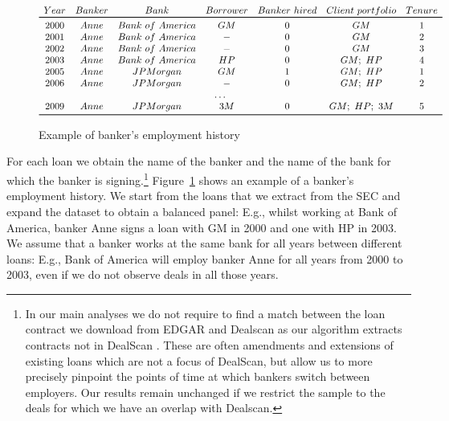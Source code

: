 \begin{figure}[H] \caption{Example of banker's employment history} \label{fig:ex} \begin{center}
	\( \begin{array}{ccccccc} 
	Year & Banker & Bank & Borrower & Banker~hired & Client~portfolio & Tenure \\ \toprule
	2000 & Anne & Bank~of~ America & GM & 0 & GM & 1\\
	2001 & Anne & Bank~of~ America & - & 0 & GM & 2\\
	2002 & Anne & Bank~of~ America & - & 0 & GM  & 3\\
	2003 & Anne & Bank~of~ America & HP & 0 & GM;~HP & 4  \\
	2005 & Anne & JPMorgan & GM & 1 & GM;~HP  & 1\\
	2006 & Anne & JPMorgan & - & 0 & GM;~HP  & 2\\
	\multicolumn{6}{c}{\ldots} \\
	2009 & Anne & JPMorgan & 3M & 0 & GM;~HP;~3M & 5\\ \bottomrule
	\end{array} \) 
\end{center} \end{figure}

For each loan we obtain the name of the banker and the name of the bank for which the banker is signing.\footnote{In our main analyses we do not require to find a match between the loan contract we download from EDGAR and Dealscan as our algorithm extracts contracts not in DealScan \citep{Herpfer.2018}. These are often amendments and extensions of existing loans which are not a focus of DealScan, but allow us to more precisely pinpoint the points of time at which  bankers switch between employers.  Our results remain unchanged if we restrict the sample to the deals for which we have an overlap with Dealscan.} Figure~\ref{fig:ex} shows an example of a banker's employment history. We start from the loans that we extract from the SEC and expand the dataset to obtain a balanced panel: E.g., whilst working at Bank of America, banker Anne signs a loan with GM in 2000 and one with HP in 2003. We assume that a banker works at the same bank for all years between different loans: E.g., Bank of America will employ banker Anne for all years from 2000 to 2003, even if we do not observe deals in all those years.

